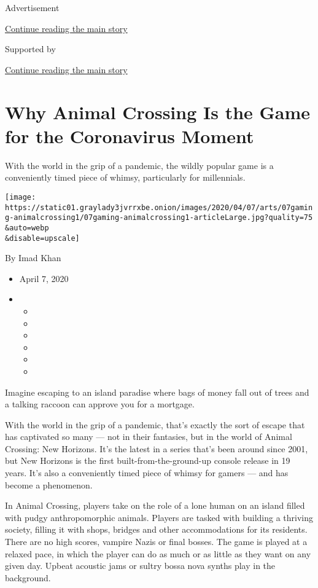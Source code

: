 Advertisement

\protect\hyperlink{after-top}{Continue reading the main story}

Supported by

\protect\hyperlink{after-sponsor}{Continue reading the main story}

\hypertarget{why-animal-crossing-is-the-game-for-the-coronavirus-moment}{%
\section{Why Animal Crossing Is the Game for the Coronavirus
Moment}\label{why-animal-crossing-is-the-game-for-the-coronavirus-moment}}

With the world in the grip of a pandemic, the wildly popular game is a
conveniently timed piece of whimsy, particularly for millennials.

\texttt{[image: https://static01.graylady3jvrrxbe.onion/images/2020/04/07/arts/07gaming-animalcrossing1/07gaming-animalcrossing1-articleLarge.jpg?quality=75\\\&auto=webp\\\&disable=upscale]}

By Imad Khan

\begin{itemize}
\item
  April 7, 2020
\item
  \begin{itemize}
  \item
  \item
  \item
  \item
  \item
  \item
  \end{itemize}
\end{itemize}

Imagine escaping to an island paradise where bags of money fall out of
trees and a talking raccoon can approve you for a mortgage.

With the world in the grip of a pandemic, that's exactly the sort of
escape that has captivated so many --- not in their fantasies, but in
the world of Animal Crossing: New Horizons. It's the latest in a series
that's been around since 2001, but New Horizons is the first
built-from-the-ground-up console release in 19 years. It's also a
conveniently timed piece of whimsy for gamers --- and has become a
phenomenon.

In Animal Crossing, players take on the role of a lone human on an
island filled with pudgy anthropomorphic animals. Players are tasked
with building a thriving society, filling it with shops, bridges and
other accommodations for its residents. There are no high scores,
vampire Nazis or final bosses. The game is played at a relaxed pace, in
which the player can do as much or as little as they want on any given
day. Upbeat acoustic jams or sultry bossa nova synths play in the
background.

